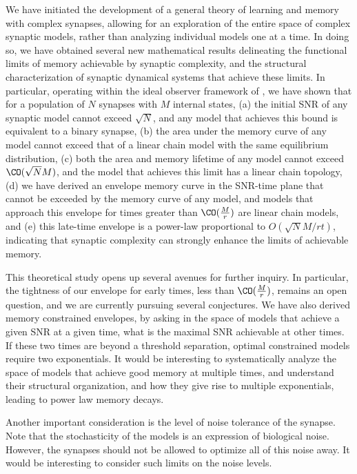 \documentclass{article} %
\begin{document}
We have initiated the development of  a general theory of learning and memory with complex synapses, allowing for an exploration of the entire space of complex synaptic models, rather than analyzing individual models one at a time.
In doing so, we have obtained several new mathematical results delineating the functional limits of memory achievable by synaptic complexity, and the structural characterization of synaptic dynamical systems that achieve these limits.
In particular, operating within the ideal observer framework of \cite{Fusi2005cascade,Fusi2007multistate,Barrett2008discrete}, we have shown that for a population of $N$ synapses with $M$ internal states, (a) the initial SNR of any synaptic model cannot exceed $\sqrt{N}$, and any model that achieves this bound is equivalent to a binary synapse, (b) the area under the memory curve of any model cannot exceed that of a linear chain model with the same equilibrium distribution, (c) both the area and memory lifetime of any model cannot exceed $\CO(\sqrt{N}M)$, and the model that achieves this limit has a linear chain topology, (d) we have derived an envelope memory curve in the SNR-time plane that cannot be exceeded by the memory curve of any model, and models that approach this envelope for times greater than $\CO(\frac{M}{r})$ are linear chain models, and (e) this late-time envelope is a power-law proportional to $O({\sqrt{N} M}/{rt})$, indicating that synaptic complexity can strongly enhance the limits of achievable memory.

This theoretical study opens up several avenues for further inquiry.
In particular, the tightness of our envelope for early times, less than $\CO(\frac{M}{r})$, remains an open question, and we are currently pursuing several conjectures.
We have also derived memory constrained envelopes, by asking in the space of models that achieve a given SNR at a given time, what is the maximal SNR achievable at other times.
If these two times are beyond a threshold separation, optimal constrained models require two exponentials.
It would be interesting to systematically analyze the space of models that achieve good memory at multiple times, and understand their structural organization, and how they give rise to multiple exponentials, leading to power law memory decays.

Another important consideration is the level of noise tolerance of the synapse.
Note that the stochasticity of the models is an expression of biological noise.
However, the synapses should not be allowed to optimize all of this noise away.
It would be interesting to consider such limits on the noise levels.
\end{document}
